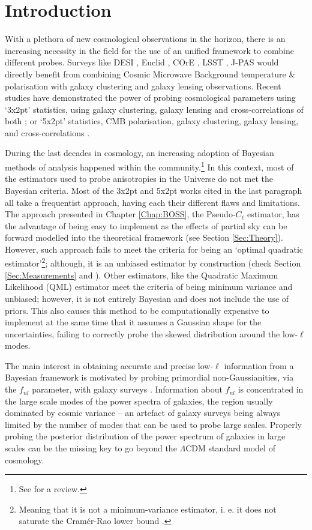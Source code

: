 \section{Introduction}
With a plethora of new cosmological observations in the horizon, there is an increasing necessity in the field for the use of an unified framework to combine different probes. Surveys like DESI \citep{2016-DESI}, Euclid \citep{2011EuclidRedPaper}, COrE \citep{2011CoRE}, LSST \citep{LSST}, J-PAS \citep{JPAS} would directly benefit from combining Cosmic Microwave Background temperature \& polarisation with galaxy clustering and galaxy lensing observations. Recent studies have demonstrated the power of probing cosmological parameters using `3x2pt' statistics, using galaxy clustering, galaxy lensing and cross-correlations of both \citep{2017MNRAS.465.1454H, 2017arXiv170801530D}; or `5x2pt' statistics, CMB polarisation, galaxy clustering, galaxy lensing, and cross-correlations \citep{2016Nicola, 2017Nicola, Doux2017}. 

\qquad During the last decades in cosmology, an increasing adoption of Bayesian methods of analysis happened within the community.\footnote{See \cite{2017TrottaReview} for a review.} In this context, most of the estimators used to probe anisotropies in the Universe do not met the Bayesian criteria. Most of the 3x2pt and 5x2pt works cited in the last paragraph all take a frequentist approach, having each their different flaws and limitations. The approach presented in Chapter \ref{Chap:BOSS}, the Pseudo-$C_{\ell}$ estimator, has the advantage of being easy to implement as the effects of partial sky can be forward modelled into the theoretical framework  (see Section \ref{Sec:Theory}). However, such approach fails to meet the criteria for being an `optimal quadratic estimator'\footnote{Meaning that it is not a minimum-variance estimator, i. e. it does not saturate the Cram\'er-Rao lower bound \citep{MR0015748,cramer2016mathematical}.}; although, it is an unbiased estimator by construction (check Section \ref{Sec:Measurements} and \cite{Peebles1973}). Other estimators, like the Quadratic Maximum Likelihood (QML) estimator meet the criteria of being minimum variance and unbiased; however, it is not entirely Bayesian and does not include the use of priors. This also causes this method to be computationally expensive to implement at the same time that it assumes a Gaussian shape for the uncertainties, failing to correctly probe the skewed distribution around the low-$\ell$ modes.

\qquad The main interest in obtaining accurate and precise low-$\ell$ information from a Bayesian framework is motivated by probing primordial non-Gaussianities, via the $f_{nl}$ parameter, with galaxy surveys \citep{2004Bartolo-fnl, 2008Dalal-fnl,2011Hamaus-fnl,2014Boris-fnl}. Information about $f_{nl}$ is concentrated in the large scale modes of the power spectra of galaxies, the region usually dominated by cosmic variance -- an artefact of galaxy surveys being always limited by the number of modes that can be used to probe large scales. Properly probing the posterior distribution of the power spectrum of galaxies in large scales can be the missing key to go beyond the $\Lambda$CDM standard model of cosmology.

